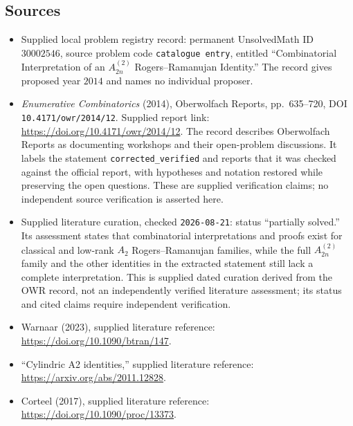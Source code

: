 \documentclass[11pt]{article}
\begin{document}
\subsection{Sources}
\begin{itemize}
\item Supplied local problem registry record: permanent UnsolvedMath ID \(30002546\), source problem code \texttt{catalogue entry}, entitled ``Combinatorial Interpretation of an \(A_{2n}^{(2)}\) Rogers--Ramanujan Identity.'' The record gives proposed year \(2014\) and names no individual proposer.
\item \textit{Enumerative Combinatorics} (2014), Oberwolfach Reports, pp.\ 635--720, DOI \texttt{10.4171/owr/2014/12}. Supplied report link: \url{https://doi.org/10.4171/owr/2014/12}. The record describes Oberwolfach Reports as documenting workshops and their open-problem discussions. It labels the statement \texttt{corrected\_verified} and reports that it was checked against the official report, with hypotheses and notation restored while preserving the open questions. These are supplied verification claims; no independent source verification is asserted here.
\item Supplied literature curation, checked \texttt{2026-08-21}: status ``partially solved.'' Its assessment states that combinatorial interpretations and proofs exist for classical and low-rank \(A_2\) Rogers--Ramanujan families, while the full \(A_{2n}^{(2)}\) family and the other identities in the extracted statement still lack a complete interpretation. This is supplied dated curation derived from the OWR record, not an independently verified literature assessment; its status and cited claims require independent verification.
\item Warnaar (2023), supplied literature reference: \url{https://doi.org/10.1090/btran/147}.
\item ``Cylindric A2 identities,'' supplied literature reference: \url{https://arxiv.org/abs/2011.12828}.
\item Corteel (2017), supplied literature reference: \url{https://doi.org/10.1090/proc/13373}.
\end{itemize}
\end{document}
